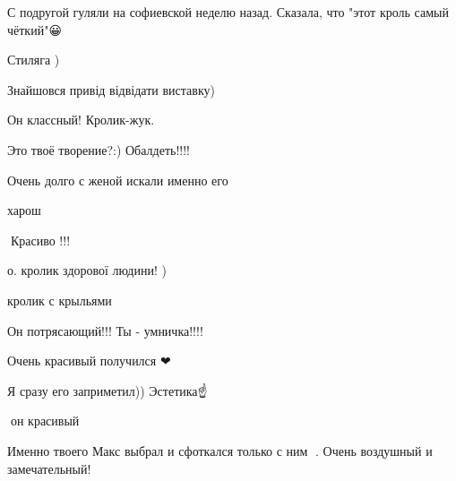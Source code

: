  
 
 
 
 

\qqSecCmt


С подругой гуляли на софиевской неделю назад. Сказала, что "этот кроль самый чёткий"😀


Стиляга )


Знайшовся привід відвідати виставку)


Он классный! Кролик-жук.


Это твоё творение?:) Обалдеть!!!!


Очень долго с женой искали именно его 🙂


харош


🤗Красиво !!!


о. кролик здорової людини! )


кролик с крыльями


Он потрясающий!!! Ты - умничка!!!!


Очень красивый получился ❤


Я сразу его заприметил)) Эстетика☝️


🖤он красивый


Именно твоего Макс выбрал и сфоткался только с ним 🙂. Очень воздушный и
замечательный!


